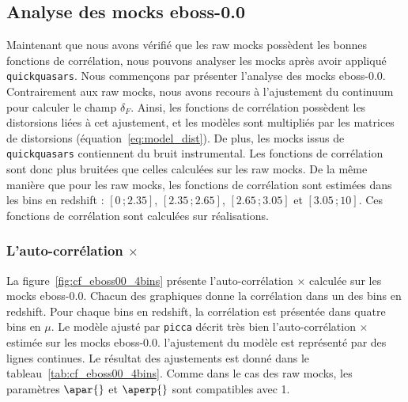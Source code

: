\subsection{Analyse des mocks eboss-0.0}
\label{subsec:ana_eboss-0.0}
Maintenant que nous avons vérifié que les raw mocks possèdent les bonnes fonctions de corrélation, nous pouvons analyser les mocks après avoir appliqué \texttt{quickquasars}.
Nous commençons par présenter l'analyse des mocks eboss-0.0.
Contrairement aux raw mocks, nous avons recours à l'ajustement du continuum pour calculer le champ $\delta_F$. Ainsi, les fonctions de corrélation possèdent les distorsions liées à cet ajustement, et les modèles sont multipliés par les matrices de distorsions (équation~\ref{eq:model_dist}). De plus, les mocks issus de \texttt{quickquasars} contiennent du bruit instrumental. Les fonctions de corrélation sont donc plus bruitées que celles calculées sur les raw mocks.
De la même manière que pour les raw mocks, les fonctions de corrélation sont estimées dans les bins en redshift : $[\num{0}\,;\num{2.35}]$, $[\num{2.35}\,;\num{2.65}]$, $[\num{2.65}\,;\num{3.05}]$ et $[\num{3.05}\,;\num{10}]$. Ces fonctions de corrélation sont calculées sur \Nmocks{} réalisations.


\subsubsection{L'auto-corrélation \lya{}$\times$\lya{}}
La figure~\ref{fig:cf_eboss00_4bins} présente l'auto-corrélation \lya{}$\times$\lya{} calculée sur les mocks eboss-0.0. Chacun des graphiques donne la corrélation dans un des bins en redshift. Pour chaque bins en redshift, la corrélation est présentée dans quatre bins en $\mu$.
Le modèle ajusté par \texttt{picca} décrit très bien l'auto-corrélation \lya{}$\times$\lya{} estimée sur les mocks eboss-0.0.
l'ajustement du modèle est représenté par des lignes continues. Le résultat des ajustements est donné dans le tableau~\ref{tab:cf_eboss00_4bins}. Comme dans le cas des raw mocks, les paramètres $\apar{}$ et $\aperp{}$ sont compatibles avec 1.

